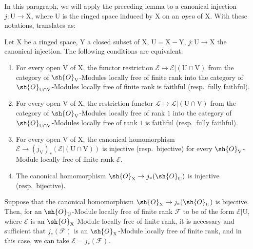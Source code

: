 In this paragraph, we will apply the preceding lemma to a canonical injection $j:\mathrm{U}\to\mathrm{X}$, where $\mathrm{U}$ is the ringed space induced by $\mathrm{X}$ on an \emph{open} of $\mathrm{X}$.
With these notations,  translates as:

\begin{corollary}[21.13.3]
\label{IV.21.13.3}
Let $\mathrm{X}$ be a ringed space, $\mathrm{Y}$ a closed subset of $\mathrm{X}$, $\mathrm{U}=\mathrm{X}-\mathrm{Y}$, $j:\mathrm{U}\to\mathrm{X}$ the canonical injection.
The following conditions are equivalent:
\begin{enumerate}[label=\emph{\alph*)}]
  \item For every open $\mathrm{V}$ of $\mathrm{X}$, the functor restriction $\mathscr{E}\mapsto\mathscr{E}|(\mathrm{U}\cap\mathrm{V})$ from the category of $\sh{O}_{\mathrm{V}}$-Modules locally free of finite rank into the category of $\sh{O}_{\mathrm{U}\cap\mathrm{V}}$-Modules locally free of finite rank is faithful (resp.\ fully faithful).
  \item[\emph{a')}] For every open $\mathrm{V}$ of $\mathrm{X}$, the restriction functor $\mathscr{L}\mapsto\mathscr{L}|(\mathrm{U}\cap\mathrm{V})$ from the category of $\sh{O}_{\mathrm{V}}$-Modules locally free of rank $1$ into the category of $\sh{O}_{\mathrm{U}\cap\mathrm{V}}$-Modules locally free of rank $1$ is faithful (resp.\ fully faithful).
  \item For every open $\mathrm{V}$ of $\mathrm{X}$, the canonical homomorphism $\mathscr{E}\to(j_{\mathrm{V}})_*(\mathscr{E}|(\mathrm{U}\cap\mathrm{V}))$ is injective (resp.\ bijective) for every $\sh{O}_{\mathrm{V}}$-Module locally free of finite rank $\mathscr{E}$.
  \item[\emph{b')}] The canonical homomorphism $\sh{O}_{\mathrm{X}}\to j_*(\sh{O}_{\mathrm{U}})$ is injective (resp.\ bijective).
\end{enumerate}

Suppose that the canonical homomorphism $\sh{O}_{\mathrm{X}}\to j_*(\sh{O}_{\mathrm{U}})$ is bijective.
Then, for an $\sh{O}_{\mathrm{U}}$-Module locally free of finite rank $\mathscr{F}$ to be of the form $\mathscr{E}|\mathrm{U}$, where $\mathscr{E}$ is an $\sh{O}_{\mathrm{X}}$-Module locally free of finite rank, it is necessary and sufficient that $j_*(\mathscr{F})$ is an $\sh{O}_{\mathrm{X}}$-Module locally free of finite rank, and in this case, we can take $\mathscr{E}=j_*(\mathscr{F})$.
\end{corollary}

